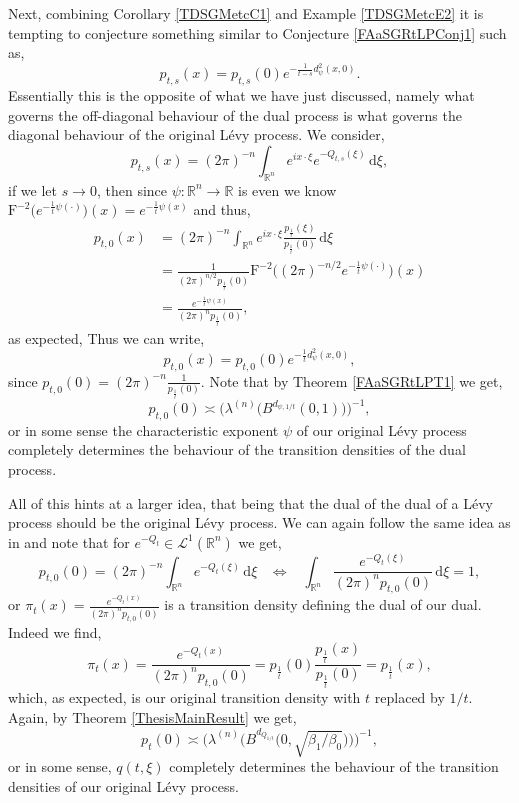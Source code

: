 \documentclass[a4paper, 12pt]{report}
\theoremstyle{remark}
\theoremstyle{definition}
\begin{document}
Next, combining Corollary \ref{TDSGMetcC1} and Example \ref{TDSGMetcE2} it is tempting to conjecture something similar to Conjecture \ref{FAaSGRtLPConj1} such as,
$$
p_{t, s}(x) = p_{t, s}(0)e^{-\frac{1}{t - s}d_\psi^2(x, 0)}.
$$
Essentially this is the opposite of what we have just discussed, namely what governs the off-diagonal behaviour of the dual process is what governs the diagonal behaviour of the original L\'evy process.  We consider,
$$
p_{t, s}(x) = (2\pi)^{-n}\int_{\mathbb{R}^n}e^{ix\cdot\xi}e^{-Q_{t, s}(\xi)}\,\mathrm{d}\xi,
$$
if we let $s \to 0$, then since $\psi : \mathbb{R}^n \to \mathbb{R}$ is even we know $\mathrm{F}^{-2}\big(e^{-\frac{1}{t}\psi(\cdot)}\big)(x) = e^{-\frac{1}{t}\psi(x)}$ and thus,
$$
\begin{aligned}
p_{t, 0}(x) & = (2\pi)^{-n}\int_{\mathbb{R}^n}e^{ix\cdot\xi}\frac{p_\frac{1}{t}(\xi)}{p_\frac{1}{t}(0)}\,\mathrm{d}\xi\\
& = \frac{1}{(2\pi)^{n/2}p_\frac{1}{t}(0)}\mathrm{F}^{-2}\big((2\pi)^{-n/2}e^{-\frac{1}{t}\psi(\cdot)}\big)(x)\\
& = \frac{e^{-\frac{1}{t}\psi(x)}}{(2\pi)^np_\frac{1}{t}(0)},
\end{aligned}
$$
as expected,  Thus we can write,
$$
p_{t, 0}(x) = p_{t, 0}(0)e^{-\frac{1}{t}d_\psi^2(x, 0)},
$$
since $p_{t, 0}(0) = (2\pi)^{-n}\frac{1}{p_\frac{1}{t}(0)}$.  Note that by Theorem \ref{FAaSGRtLPT1} we get,
$$
p_{t, 0}(0) \asymp \Big(\lambda^{(n)}\big(B^{d_{\psi, 1/t}}(0, 1)\big)\Big)^{-1},
$$
or in some sense the characteristic exponent $\psi$ of our original L\'evy process completely determines the behaviour of the transition densities of the dual process.

All of this hints at a larger idea, that being that the dual of the dual of a L\'evy process should be the original L\'evy process.  We can again follow the same idea as in \cite{Paper} and note that for $e^{-Q_t} \in \mathcal{L}^1(\mathbb{R}^n)$ we get,
$$
p_{t, 0}(0) = (2\pi)^{-n}\int_{\mathbb{R}^n}e^{-Q_t(\xi)}\,\mathrm{d}\xi \,\,\,\,\, \Leftrightarrow \,\,\,\,\, \int_{\mathbb{R}^n}\frac{e^{-Q_t(\xi)}}{(2\pi)^np_{t, 0}(0)}\,\mathrm{d}\xi = 1,
$$
or $\pi_t(x) = \frac{e^{-Q_t(x)}}{(2\pi)^np_{t, 0}(0)}$ is a transition density defining the dual of our dual.  Indeed we find,
$$
\pi_t(x) = \frac{e^{-Q_t(x)}}{(2\pi)^np_{t, 0}(0)} = p_\frac{1}{t}(0)\frac{p_\frac{1}{t}(x)}{p_\frac{1}{t}(0)} = p_\frac{1}{t}(x),
$$
which, as expected, is our original transition density with $t$ replaced by $1/t$. Again, by Theorem \ref{ThesisMainResult} we get,
$$
p_t(0) \asymp \bigg(\lambda^{(n)}\Big(B^{d_{Q_{1/t}}}\big(0, \sqrt{\beta_1/\beta_0}\big)\Big)\bigg)^{-1},
$$
or in some sense, $q(t, \xi)$ completely determines the behaviour of the transition densities of our original L\'evy process.
\end{document}
